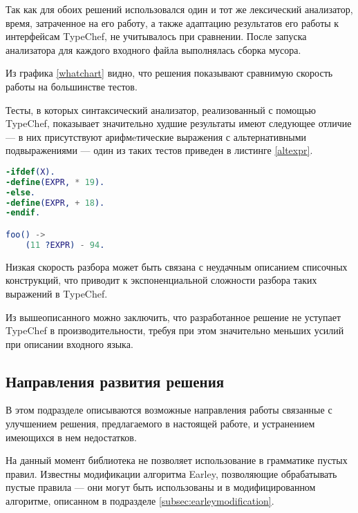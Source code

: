Так как для обоих решений использовался один и тот же лексический анализатор, время, затраченное на его работу, а также адаптацию результатов его работы к интерфейсам TypeChef, не учитывалось при сравнении. После запуска анализатора для каждого входного файла выполнялась сборка мусора.



Из графика \ref{whatchart} видно, что решения показывают сравнимую скорость работы на большинстве тестов. 

Тесты, в которых синтаксический анализатор, реализованный с помощью TypeChef, показывает значительно худшие результаты имеют следующее отличие --- в них присутствуют арифмeтические выражения с альтернативными подвыражениями --- один из таких тестов приведен в листинге \ref{altexpr}. 

\begin{minipage}{\linewidth}
\begin{lstlisting}[caption={Один из тестов с альтернативными подвыражениями},language=Erlang,label=altexpr]
-ifdef(X).
-define(EXPR, * 19).
-else.
-define(EXPR, + 18).
-endif.

foo() ->
    (11 ?EXPR) - 94.
\end{lstlisting}
\end{minipage}

Низкая скорость разбора может быть связана с неудачным описанием списочных конструкций, что приводит к экспоненциальной сложности разбора таких выражений в TypeChef.

Из вышеописанного можно заключить, что разработанное решение не уступает TypeChef в производительности, требуя при этом значительно меньших усилий при описании входного языка.

\subsection{Направления развития решения}

В этом подразделе описываются возможные направления работы связанные с улучшением решения, предлагаемого в настоящей работе, и устранением имеющихся в нем недостатков. 

На данный момент библиотека не позволяет использование в грамматике пустых правил. Известны модификации алгоритма Earley, позволяющие обрабатывать пустые правила \cite{emptyrules} --- они могут быть использованы и в модифицированном алгоритме, описанном в подразделе \ref{subsec:earleymodification}.

